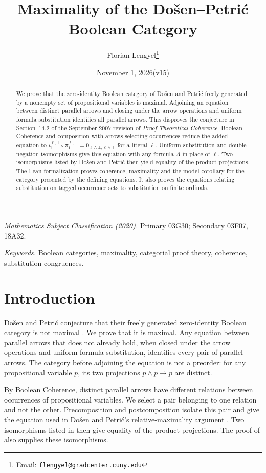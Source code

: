 \documentclass[11pt]{article}
\title{Maximality of the Do\v{s}en--Petri\'c Boolean Category}
\author{Florian Lengyel\thanks{Email: \href{mailto:flengyel@gradcenter.cuny.edu}{\texttt{flengyel@gradcenter.cuny.edu}}}}
\date{November 1, 2026\quad(v15)}
\begin{document}
\maketitle

\begin{abstract}
We prove that the zero-identity Boolean category of Do\v{s}en and
Petri\'c freely generated by a nonempty set of propositional variables
is maximal. Adjoining an equation between distinct parallel arrows
and closing under the arrow operations and uniform formula
substitution identifies all parallel arrows. This disproves the
conjecture in Section~14.2 of the September 2007 revision of
\emph{Proof-Theoretical Coherence}. Boolean Coherence and composition
with arrows selecting occurrences reduce the added equation to
$\iota_1^{\ell,\top}\circ\pi_1^{\ell,\bot}
=0_{\ell\wedge\bot,\ell\vee\top}$ for a literal $\ell$.
Uniform substitution and double-negation isomorphisms give this
equation with any formula $A$ in place of $\ell$. Two isomorphisms
listed by Do\v{s}en and Petri\'c then yield equality of the product
projections. The Lean formalization proves coherence, maximality and
the model corollary for the category presented by the defining
equations. It also proves the equations relating substitution on
tagged occurrence sets to substitution on finite ordinals.
\end{abstract}

\medskip
\noindent\textit{Mathematics Subject Classification (2020).}
Primary 03G30; Secondary 03F07, 18A32.

\smallskip
\noindent\textit{Keywords.} Boolean categories, maximality, categorial proof theory,
coherence, substitution congruences.

\section{Introduction}

Do\v{s}en and Petri\'c conjecture that their freely generated
zero-identity Boolean category is not maximal
\cite[\S14.2, p.~322]{DP}. We prove that it is maximal. Any equation
between parallel arrows that does not already hold, when closed under
the arrow operations and uniform formula substitution, identifies
every pair of parallel arrows. The category before adjoining the
equation is not a preorder: for any propositional variable $p$, its
two projections $p\wedge p\to p$ are distinct.

By Boolean Coherence, distinct parallel arrows have different
relations between occurrences of propositional variables. We select
a pair belonging to one relation and not the other. Precomposition
and postcomposition isolate this pair and give the equation used in
Do\v{s}en and Petri\'c's relative-maximality argument
\cite[\S9.7, pp.~215--216]{DP}. Two isomorphisms listed in
\cite[\S12.5, p.~294]{DP} then give equality of the product projections.
The proof of \cite[Lemma~7]{DPIsomorphic} also supplies these
isomorphisms.
\end{document}
